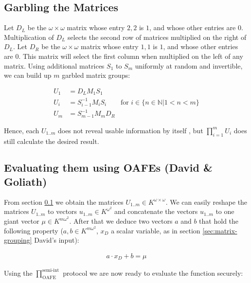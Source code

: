 \documentclass[12pt, a4paper]{article}
\begin{document}
\subsection{Garbling the Matrices}
\label{sec:matrix-garbling}

Let $D_L$ be the $\omega \times \omega$ matrix whose entry $2,2$ is $1$, and
whose other entries are $0$. Multiplication of $D_L$ selects the second row of
matrices multiplied on the right of $D_L$. Let $D_R$ be the $\omega \times
\omega$ matrix whose entry $1,1$ is $1$, and whose other entries are $0$. This
matrix will select the first column when multiplied on the left of any matrix.
Using additional matrices $S_1$ to $S_{m}$ uniformly at random and invertible,
we can build up $m$ garbled matrix groups:

\begin{align*}
U_1 & = D_L M_1 S_1 \\
U_i & = S_{i-1}^{-1} M_i S_i &
\text{for $i \in \{n \in \mathbb{N} \big| 1 < n < m\}$}\\
U_m & = S_{m-1}^{-1} M_m D_R
\end{align*}

\noindent{} Hence, each $U_{1..m}$ does not reveal usable information by itself
\cite{cramer03}, but $\prod_{i=1}^m U_i$ does still calculate the desired
result.


\subsection{Evaluating them using OAFEs (David \& Goliath)}

From section \ref{sec:matrix-garbling} we obtain the matrices $U_{1..m} \in
K^{\omega \times \omega}$. We can easily reshape the matrices $U_{1..m}$ to
vectors $u_{1..m} \in K^{\omega^2}$ and concatenate the vectors $u_{1..m}$ to
one giant vector $\mu \in K^{m\omega^2}$. After that we deduce two vectors $a$
and $b$ that hold the following property ($a, b \in K^{m\omega^2}$, $x_D$ a
scalar variable, as in section \ref{sec:matrix-grouping} David's input):

\begin{align}
a \cdot x_D + b = \mu
\end{align}

Using the $\prod^{\text{semi-int}}_{\text{OAFE}}$ protocol\cite{davidgoliath} we
are now ready to evaluate the function securely:
\end{document}
